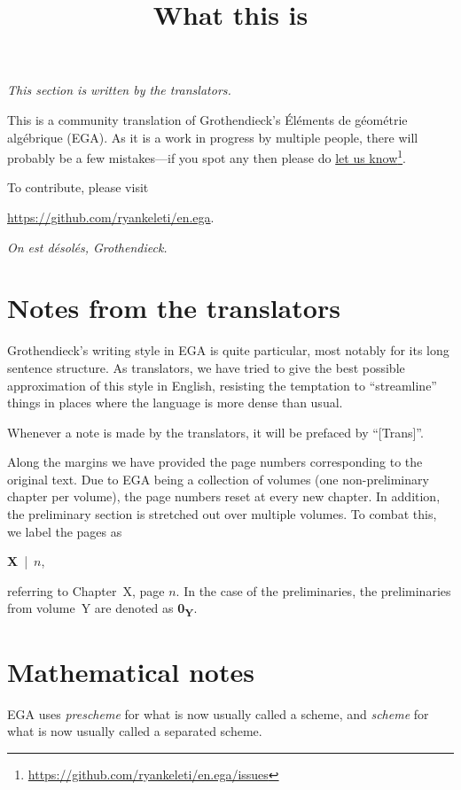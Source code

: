 
\title{What this is}
\maketitle

\label{section-phantom}


\noindent
{\em This section is written by the translators.}

\noindent
This is a community translation of Grothendieck's \'El\'ements de g\'eom\'etrie alg\'ebrique (EGA).
As it is a work in progress by multiple people, there will probably be a few mistakes---if you spot any then please do \href{https://github.com/ryankeleti/en.ega/issues}{let us know}\footnote{\url{https://github.com/ryankeleti/en.ega/issues}}.

\noindent
To contribute, please visit
\begin{center}
  \url{https://github.com/ryankeleti/en.ega}.
\end{center}

\noindent
{\em On est d\'esol\'es, Grothendieck.}

\section*{Notes from the translators}
Grothendieck's writing style in EGA is quite particular, most notably for its long sentence structure.
As translators, we have tried to give the best possible approximation of this style in English, resisting the temptation to ``streamline'' things in places where the language is more dense than usual.

Whenever a note is made by the translators, it will be prefaced by ``[Trans]''.

Along the margins we have provided the page numbers corresponding to the original text.
Due to EGA being a collection of volumes (one non-preliminary chapter per volume), the page numbers reset at every new chapter.
In addition, the preliminary section is stretched out over multiple volumes.
To combat this, we label the pages as
\begin{center}
  \textbf{X}~|~$n$,
\end{center}
referring to Chapter~X, page $n$.
In the case of the preliminaries, the preliminaries from volume~Y are denoted as \textbf{0\textsubscript{Y}}.

\section*{Mathematical notes}
EGA uses {\em prescheme} for what is now usually called a scheme, and {\em scheme} for what is now usually called a separated scheme.



